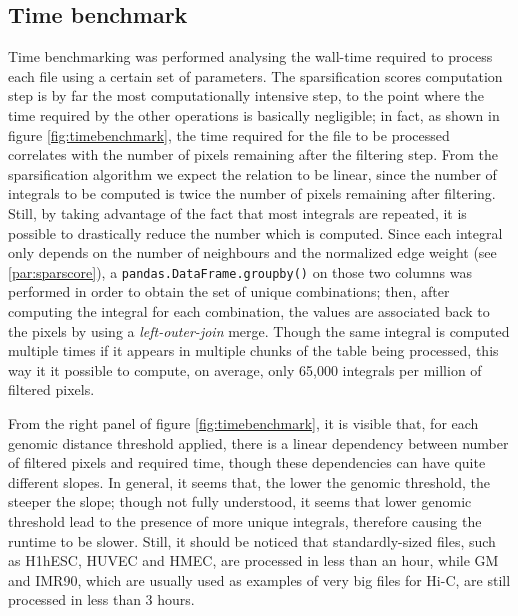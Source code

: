 \subsection{Time benchmark}
Time benchmarking was performed analysing the wall-time required to process each file using a certain set of parameters. The sparsification scores computation step is by far the most computationally intensive step, to the point where the time required by the other operations is basically negligible; in fact, as shown in figure \ref{fig:timebenchmark}, the time required for the file to be processed correlates with the number of pixels remaining after the filtering step. From the sparsification algorithm we expect the relation to be linear, since the number of integrals to be computed is twice the number of pixels remaining after filtering. Still, by taking advantage of the fact that most integrals are repeated, it is possible to drastically reduce the number which is computed. Since each integral only depends on the number of neighbours and the normalized edge weight (see \ref{par:sparscore}), a \texttt{pandas.DataFrame.groupby()} on those two columns was performed in order to obtain the set of unique combinations; then, after computing the integral for each combination, the values are associated back to the pixels by using a \textit{left-outer-join} merge. Though the same integral is computed multiple times if it appears in multiple chunks of the table being processed, this way it it possible to compute, on average, only 65,000 integrals per million of filtered pixels.

From the right panel of figure \ref{fig:timebenchmark}, it is visible that, for each genomic distance threshold applied, there is a linear dependency between number of filtered pixels and required time, though these dependencies can have quite different slopes. In general, it seems that, the lower the genomic threshold, the steeper the slope; though not fully understood, it seems that lower genomic threshold lead to the presence of more unique integrals, therefore causing the runtime to be slower. Still, it should be noticed that standardly-sized files, such as H1hESC, HUVEC and HMEC, are processed in less than an hour, while GM and IMR90, which are usually used as examples of very big files for Hi-C, are still processed in less than 3 hours. 

